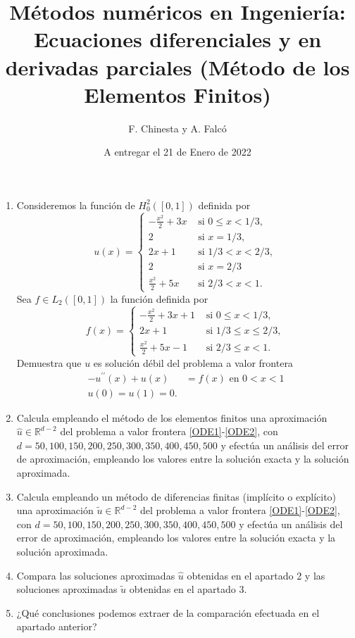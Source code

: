 \documentclass[a4paper,10pt]{article}
\begin{document}
\title{Métodos numéricos en Ingeniería: Ecuaciones diferenciales y en derivadas parciales (Método de los Elementos Finitos)}
\author{F. Chinesta y A. Falcó}
\date{A entregar el 21 de Enero de 2022}
\maketitle

\begin{enumerate}
\item Consideremos la función de $H_0^2([0,1])$ definida por
$$
u(x)= \left\{
\begin{array}{cc}
-\frac{x^2}{2}+3x & \text{ si } 0 \le x < 1/3, \\ 
2 & \text{ si } x=1/3, \\ 
2x +1 & \text{ si } 1/3 < x < 2/3, \\ 
2 & \text{ si } x= 2/3 \\ 
\frac{x^2}{2}+5x & \text{ si } 2/3 < x < 1.
\end{array}
\right.
$$
Sea $f \in L_2([0,1])$ la función definida por
$$
f(x)= \left\{
\begin{array}{cc}
-\frac{x^2}{2}+3x +1 & \text{ si } 0 \le x < 1/3, \\ 
2x +1 & \text{ si } 1/3 \le  x \le   2/3, \\ 
\frac{x^2}{2}+5x -1& \text{ si } 2/3 \le  x < 1.
\end{array}
\right.
$$
Demuestra que $u$ es solución débil del problema a valor frontera 
\begin{align}
- u^{\prime \prime}(x) + u(x) & = f(x) \text{ en } 0 < x < 1 \label{ODE1} \\ 
 u(0) = u(1) = 0.  \label{ODE2}
\end{align}
\item Calcula empleando el método de los elementos finitos una aproximación 
$\widehat{u} \in \mathbb{R}^{d-2}$ del problema a valor frontera \eqref{ODE1}-\eqref{ODE2}, con
$d=50,100,150,200,250,300,350,400,450,500$ y efectúa un análisis del error de aproximación, empleando
los valores entre la solución exacta y la solución aproximada.
\item Calcula empleando un método de diferencias finitas (implícito o explícito) una aproximación 
$\tilde{u} \in \mathbb{R}^{d-2}$ del problema a valor frontera \eqref{ODE1}-\eqref{ODE2}, con
$d=50,100,150,200,250,300,350,400,450,500$ y efectúa un análisis del error de aproximación, empleando
los valores entre la solución exacta y la solución aproximada.
\item Compara las soluciones aproximadas $\widehat{u}$ obtenidas en el apartado 2 y las soluciones aproximadas 
$\tilde{u}$ obtenidas en el apartado 3.
\item ¿Qué conclusiones podemos extraer de la comparación efectuada en el apartado anterior? 
\end{enumerate}
\end{document}
